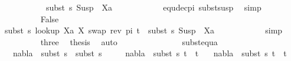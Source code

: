 \begin{isabellebody}
\ \ \ \ \ \ \ \ \ \ {\isasymapprox}\ subst\ s\ {\isacharparenleft}{\kern0pt}Susp\ {\isacharbrackleft}{\kern0pt}{\isacharbrackright}{\kern0pt}\ Xa{\isacharparenright}{\kern0pt}{\isachardoublequoteclose}\isanewline
\ \ \ \ \ \ \ \ \ \ \isamarkupfalse%
\ equ{\isacharunderscore}{\kern0pt}dec{\isacharunderscore}{\kern0pt}pi\ subst{\isacharunderscore}{\kern0pt}susp\ \isamarkupfalse%
\ simp\isanewline
\ \ \ \ \ \ \isamarkupfalse%
\isanewline
\ \ \ \ \ \ \ \ \isamarkupfalse%
\ False\isanewline
\ \ \ \ \ \ \ \ \isamarkupfalse%
\ {\isachardoublequoteopen}subst\ s\ {\isacharparenleft}{\kern0pt}look{\isacharunderscore}{\kern0pt}up\ Xa\ {\isacharbrackleft}{\kern0pt}{\isacharparenleft}{\kern0pt}X{\isacharcomma}{\kern0pt}\ swap\ {\isacharparenleft}{\kern0pt}rev\ pi{\isacharparenright}{\kern0pt}\ t{\isacharparenright}{\kern0pt}{\isacharbrackright}{\kern0pt}{\isacharparenright}{\kern0pt}\ {\isacharequal}{\kern0pt}\ subst\ s\ {\isacharparenleft}{\kern0pt}Susp\ {\isacharbrackleft}{\kern0pt}{\isacharbrackright}{\kern0pt}\ Xa{\isacharparenright}{\kern0pt}{\isachardoublequoteclose}\isanewline
\ \ \ \ \ \ \ \ \ \ \isamarkupfalse%
\ simp\isanewline
\ \ \ \ \ \ \ \ \isamarkupfalse%
\ three\ \isamarkupfalse%
\ {\isacharquery}{\kern0pt}thesis\ \isamarkupfalse%
\ auto\isanewline
\ \ \ \ \ \ \isamarkupfalse%
\isanewline
\ \ \ \ \isamarkupfalse%
\isanewline
\ \ \isamarkupfalse%
%
\endisatagproof
{\isafoldproof}%
%
\isadelimproof
\isanewline
%
\endisadelimproof
\isanewline
{}\isamarkupfalse%
\ subst{\isacharunderscore}{\kern0pt}equ{\isacharunderscore}{\kern0pt}a{\isacharcolon}{\kern0pt}\isanewline
\ \ \ {\isachardoublequoteopen}nabla\ {\isasymTurnstile}\ {\isacharparenleft}{\kern0pt}subst\ s{}{\isacharparenright}{\kern0pt}\ {\isasymapprox}\ {\isacharparenleft}{\kern0pt}subst\ s{}{\isacharparenright}{\kern0pt}{\isachardoublequoteclose}\isanewline
\ \ \ \ \ {\isachardoublequoteopen}nabla\ {\isasymturnstile}\ {\isacharparenleft}{\kern0pt}subst\ s{}\ t{}{\isacharparenright}{\kern0pt}\ {\isasymapprox}\ t{}{\isachardoublequoteclose}\isanewline
\ \ \ {\isachardoublequoteopen}nabla\ {\isasymturnstile}\ {\isacharparenleft}{\kern0pt}subst\ s{}\ t{}{\isacharparenright}{\kern0pt}\ {\isasymapprox}\ t{}{\isachardoublequoteclose}\isanewline
%

\end{isabellebody}

